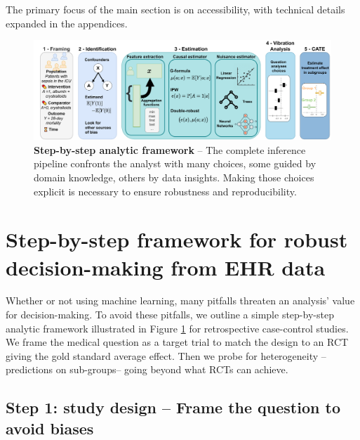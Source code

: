 \documentclass[10pt,letterpaper]{article}
\begin{document}
 The primary focus of the main section is on accessibility, with technical details expanded in the appendices.

%

\begin{figure}[t!]
  \centering
  \includegraphics[width=0.9\linewidth]{img/complete_inference_flow.pdf}
  \caption{\textbf{Step-by-step analytic framework} -- The complete
    inference pipeline confronts the analyst with
    many choices, some guided by domain knowledge, others
    by data insights. Making those choices explicit is necessary to ensure
    robustness and reproducibility.}\label{fig:inference_framework}
\end{figure}


\section*{Step-by-step framework for robust decision-making from EHR data}\label{sec:inference_flow}

Whether or not using machine learning, many pitfalls threaten an analysis'
value for decision-making. To avoid these pitfalls, we outline a simple
step-by-step analytic framework illustrated in Figure
\ref{fig:inference_framework} for retrospective case-control studies. We frame
the medical question as a target trial \cite{hernan2021methods} to match the
design to an RCT giving the gold standard average effect. Then we probe for
heterogeneity --predictions on sub-groups--  going beyond what RCTs can
achieve.

\subsection*{Step 1: study design -- Frame the question to avoid biases}\label{sec:framing}
\end{document}

